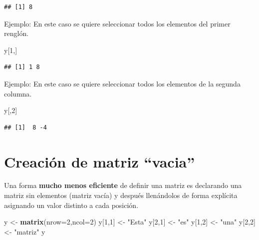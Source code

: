 \documentclass[
]{book}
\newenvironment{Shaded}{\begin{snugshade}}{\end{snugshade}}
\newcommand{\AttributeTok}[1]{\textcolor[rgb]{0.13,0.29,0.53}{#1}}
\newcommand{\DecValTok}[1]{\textcolor[rgb]{0.00,0.00,0.81}{#1}}
\newcommand{\FunctionTok}[1]{\textcolor[rgb]{0.13,0.29,0.53}{\textbf{#1}}}
\newcommand{\NormalTok}[1]{#1}
\newcommand{\OtherTok}[1]{\textcolor[rgb]{0.56,0.35,0.01}{#1}}
\newcommand{\StringTok}[1]{\textcolor[rgb]{0.31,0.60,0.02}{#1}}
\begin{document}
\begin{verbatim}
## [1] 8
\end{verbatim}

Ejemplo: En este caso se quiere seleccionar todos los elementos del primer renglón.

\begin{Shaded}
\begin{Highlighting}[]
\NormalTok{y[}\DecValTok{1}\NormalTok{,]}
\end{Highlighting}
\end{Shaded}

\begin{verbatim}
## [1] 1 8
\end{verbatim}

Ejemplo: En este caso se quiere seleccionar todos los elementos de la segunda columna.

\begin{Shaded}
\begin{Highlighting}[]
\NormalTok{y[,}\DecValTok{2}\NormalTok{]}
\end{Highlighting}
\end{Shaded}

\begin{verbatim}
## [1]  8 -4
\end{verbatim}

\section{Creación de matriz ``vacia''}\label{creaciuxf3n-de-matriz-vacia}

Una forma \textbf{mucho menos eficiente} de definir una matriz es declarando una matriz sin elementos (matriz vacía) y después llenándolos de forma explícita asignando un valor distinto a cada posición.

\begin{Shaded}
\begin{Highlighting}[]
\NormalTok{ y }\OtherTok{\textless{}{-}} \FunctionTok{matrix}\NormalTok{(}\AttributeTok{nrow=}\DecValTok{2}\NormalTok{,}\AttributeTok{ncol=}\DecValTok{2}\NormalTok{)}
\NormalTok{y[}\DecValTok{1}\NormalTok{,}\DecValTok{1}\NormalTok{] }\OtherTok{\textless{}{-}} \StringTok{"Esta"}
\NormalTok{y[}\DecValTok{2}\NormalTok{,}\DecValTok{1}\NormalTok{] }\OtherTok{\textless{}{-}} \StringTok{"es"}
\NormalTok{y[}\DecValTok{1}\NormalTok{,}\DecValTok{2}\NormalTok{] }\OtherTok{\textless{}{-}} \StringTok{"una"}
\NormalTok{y[}\DecValTok{2}\NormalTok{,}\DecValTok{2}\NormalTok{] }\OtherTok{\textless{}{-}} \StringTok{"matriz"}
\NormalTok{y}
\end{Highlighting}
\end{Shaded}
\end{document}
